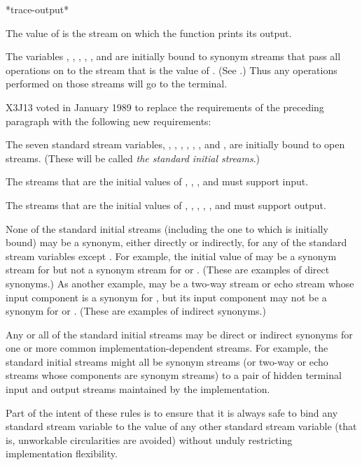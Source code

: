 \begin{defun}[Variable]
*trace-output*

The value of  is the stream on which the 
function prints its output.
\end{defun}

The variables
, ,
,
,
, and 
are initially bound to synonym streams that pass all
operations on to the stream that is the value of .
(See .)
Thus any operations performed on those streams will go to the terminal.

\begin{new}
X3J13 voted in January 1989
to replace the requirements of the preceding
paragraph with the following new requirements:

The seven standard stream variables,
, , ,
, ,
, and
,
are initially bound to open streams.  (These will be called
\emph{the standard initial streams}.)

The streams that are the initial values of
, , , and 
must support input.

The streams that are the initial values of
,
,
, , , and 
must support output.

None of the standard initial streams (including the one to which
 is initially bound) may be a synonym, either directly
or indirectly, for any of the standard stream variables
except .  For example, the initial value of
 may be a synonym stream for 
but not a synonym stream for  or .
(These are examples of direct synonyms.)  As another example,
 may be a two-way stream or echo stream whose
input component is a synonym for ,
but its input component may not be a synonym for 
or .  (These are examples of indirect synonyms.)

Any or all of the standard initial streams may be direct or indirect
synonyms for one or more common implementation-dependent streams.
For example, the standard initial streams might all be synonym streams
(or two-way or echo streams whose components are synonym streams)
to a pair of hidden terminal input and output streams maintained by
the implementation.

Part of the intent of these rules is to ensure that it is always safe
to bind any standard stream variable to the value of any other
standard stream variable (that is, unworkable circularities are
avoided) without unduly restricting implementation flexibility.
\end{new}

